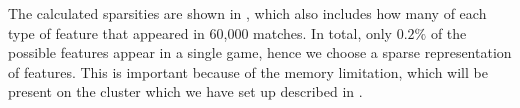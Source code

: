   \begin{table}[!htb]
    \centering
    \caption{The sparsity of each type of feature}\label{tab:featuresparsity}
  \end{table}

The calculated sparsities are shown in , which also includes how many of each type of feature that appeared in 60,000 matches.
In total, only $0.2\%$ of the possible features appear in a single game, hence we choose a sparse representation of features. This is important because of the memory limitation, which will be present on the cluster which we have set up described in . 


